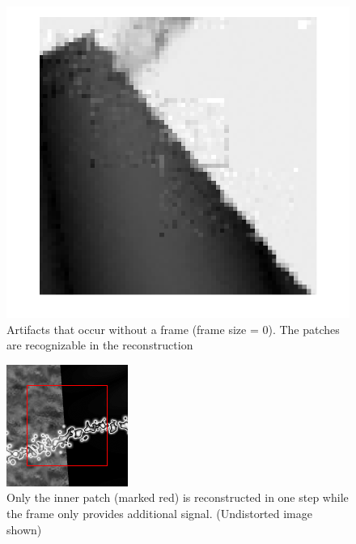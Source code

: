 \documentclass[10pt,conference,compsocconf]{IEEEtran}
\begin{document}
\begin{figure}[tbp]
  \centering
  \includegraphics[width=\columnwidth]{images/boundaryArtifact_noframe.png}
  \caption{Artifacts that occur without a frame (frame size = 0). The patches are recognizable in the reconstruction}
  \label{fig:boundaryArtifacts}
\end{figure}

\begin{figure}[tbp]
  \centering
  \includegraphics[width=\columnwidth]{images/imageFraming.png}
  \caption{Only the inner patch (marked red) is reconstructed in one step while the frame only provides additional signal. (Undistorted image shown) }
  \label{fig:framing}
\end{figure}
\end{document}
